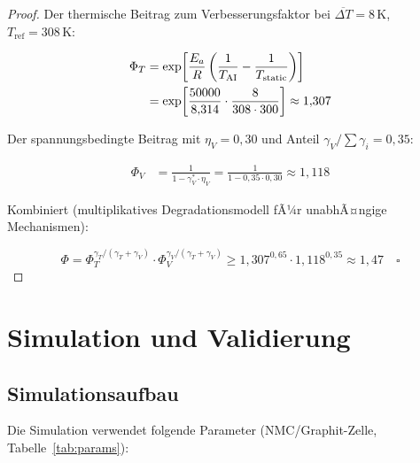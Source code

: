 ﻿\documentclass[12pt,a4paper]{article}
\begin{document}
	\begin{proof}
		Der thermische Beitrag zum Verbesserungsfaktor bei $\overline{\Delta T} = 8\,\mathrm{K}$,
		$T_\mathrm{ref} = 308\,\mathrm{K}$:
		
		\begin{align}
			\Phi_T &= \exp\!\left[\frac{E_a}{R}\left(\frac{1}{T_\mathrm{AI}} -
			\frac{1}{T_\mathrm{static}}\right)\right] \notag\\
			&= \exp\!\left[\frac{50000}{8{,}314}\cdot\frac{8}{308 \cdot 300}\right]
			\approx 1{,}307
		\end{align}
		
		Der spannungsbedingte Beitrag mit $\eta_V = 0{,}30$ und Anteil $\gamma_V / \sum \gamma_i = 0{,}35$:
		
		\begin{align}
			\Phi_V &= \frac{1}{1 - \gamma_V^* \cdot \eta_V}
			= \frac{1}{1 - 0{,}35 \cdot 0{,}30} \approx 1{,}118
		\end{align}
		
		Kombiniert (multiplikatives Degradationsmodell fÃ¼r unabhÃ¤ngige Mechanismen):
		
		\begin{equation}
			\Phi = \Phi_T^{\gamma_T/(\gamma_T+\gamma_V)} \cdot \Phi_V^{\gamma_V/(\gamma_T+\gamma_V)}
			\geq 1{,}307^{0{,}65} \cdot 1{,}118^{0{,}35} \approx 1{,}47 \quad \square
		\end{equation}
	\end{proof}
	
	\section{Simulation und Validierung}
	\label{sec:simulation}
	
	\subsection{Simulationsaufbau}
	
	Die Simulation verwendet folgende Parameter (NMC/Graphit-Zelle, Tabelle~\ref{tab:params}):
	
\end{document}
